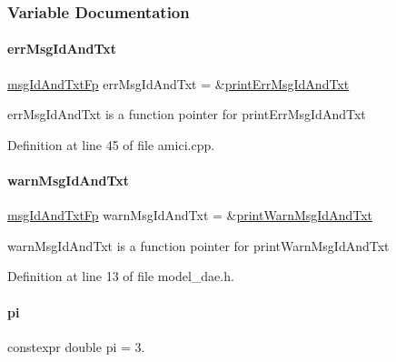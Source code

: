 \subsubsection{Variable Documentation}
\mbox{\label{namespaceamici_a19eefc037cc960b013cc0b724e5292b7}} 
\paragraph{\texorpdfstring{err\+Msg\+Id\+And\+Txt}{errMsgIdAndTxt}}
{\footnotesize\ttfamily \mbox{\hyperlink{namespaceamici_a02384ab9af881494db3ed32cd6ecdcc0}{msg\+Id\+And\+Txt\+Fp}} err\+Msg\+Id\+And\+Txt = \&\mbox{\hyperlink{namespaceamici_ade28c6a7f1b5aee40bb2453fb61b4024}{print\+Err\+Msg\+Id\+And\+Txt}}}

err\+Msg\+Id\+And\+Txt is a function pointer for print\+Err\+Msg\+Id\+And\+Txt 

Definition at line 45 of file amici.\+cpp.

\mbox{\label{namespaceamici_adb95b29229e987b4b0a55ade25961688}} 
\paragraph{\texorpdfstring{warn\+Msg\+Id\+And\+Txt}{warnMsgIdAndTxt}}
{\footnotesize\ttfamily \mbox{\hyperlink{namespaceamici_a02384ab9af881494db3ed32cd6ecdcc0}{msg\+Id\+And\+Txt\+Fp}} warn\+Msg\+Id\+And\+Txt = \&\mbox{\hyperlink{namespaceamici_a14122f73594a970df27bfcb8fa0db35d}{print\+Warn\+Msg\+Id\+And\+Txt}}}

warn\+Msg\+Id\+And\+Txt is a function pointer for print\+Warn\+Msg\+Id\+And\+Txt 

Definition at line 13 of file model\+\_\+dae.\+h.

\mbox{\label{namespaceamici_ad172e8d1a294401209781f9aeaa77410}} 
\paragraph{\texorpdfstring{pi}{pi}}
{\footnotesize\ttfamily constexpr double pi = 3.}

